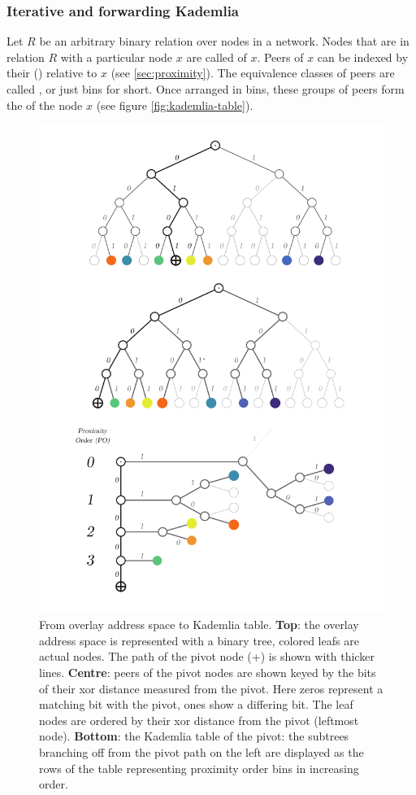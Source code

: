 \subsubsection{Iterative and forwarding Kademlia}

Let $R$ be an arbitrary binary relation over nodes in a network. Nodes that are in relation $R$ with a particular node $x$ are called  of $x$. Peers of $x$ can be indexed by their  () relative to $x$ (see \ref{sec:proximity}).
The equivalence classes of peers are called , or just bins for short. Once arranged in bins, these groups of peers form the  of the node $x$ (see figure \ref{fig:kademlia-table}). 



\begin{figure}[htbp]
   \centering
    \includegraphics[width=.85\textwidth]{fig/kademlia-35.pdf}
   \caption[From overlay address space to Kademlia table \statusgreen]{From overlay address space to Kademlia table. \textbf{Top}: the overlay address space is represented with a binary tree, colored leafs are actual nodes. The path of the pivot node (+) is shown with thicker lines. \textbf{Centre}: peers of the pivot nodes are shown keyed by the bits of their xor distance measured from the pivot. Here zeros represent a matching bit with the pivot, ones show a differing bit. The leaf nodes are ordered by their xor distance from the pivot (leftmost node). \textbf{Bottom}: the Kademlia table of the pivot: the subtrees branching off from the pivot path on the left are displayed as the rows of the table representing proximity order bins in increasing order.}

\end{figure}
